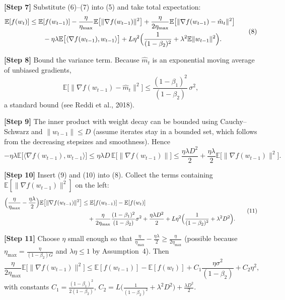 \documentclass[11pt]{article}
\newcommand{\E}{\mathbb{E}}
\begin{document}
\noindent\textbf{[Step 7]} Substitute (6)–(7) into (5) and take total expectation:
\[
\begin{aligned}
\E[f(w_t)] &\le \E[f(w_{t-1})]
-\frac{\eta}{\eta_{\max}}\E\bigl[\|\nabla f(w_{t-1})\|^{2}\bigr]
+\frac{\eta}{2\eta_{\max}}\E\bigl[\|\nabla f(w_{t-1})-\hat m_{t}\|^{2}\bigr] \\
&\qquad -\eta\lambda\E\bigl[\langle\nabla f(w_{t-1}),w_{t-1}\rangle\bigr]
+L\eta^{2}\Bigl(\frac{1}{(1-\beta_2)^{2}}+\lambda^{2}\E\|w_{t-1}\|^{2}\Bigr).
\end{aligned}
\tag{8}
\]

\noindent\textbf{[Step 8]} Bound the variance term. Because $\hat m_t$ is an exponential moving average of unbiased gradients,
\[
\E\bigl[\|\nabla f(w_{t-1})-\hat m_{t}\|^{2}\bigr]\le \frac{(1-\beta_1)^{2}}{(1-\beta_2)}\,\sigma^{2},
\tag{9}
\]
a standard bound (see Reddi et al., 2018).  

\noindent\textbf{[Step 9]} The inner product with weight decay can be bounded using Cauchy–Schwarz and $\|w_{t-1}\|\le D$ (assume iterates stay in a bounded set, which follows from the decreasing stepsizes and smoothness). Hence
\[
-\eta\lambda\E\bigl[\langle\nabla f(w_{t-1}),w_{t-1}\rangle\bigr]
\le \eta\lambda D\,\E\bigl[\|\nabla f(w_{t-1})\|\bigr]
\le \frac{\eta\lambda D^{2}}{2}+\frac{\eta\lambda}{2}\E\bigl[\|\nabla f(w_{t-1})\|^{2}\bigr].
\tag{10}
\]

\noindent\textbf{[Step 10]} Insert (9) and (10) into (8). Collect the terms containing $\E[\|\nabla f(w_{t-1})\|^{2}]$ on the left:
\[
\begin{aligned}
\Bigl(\frac{\eta}{\eta_{\max}}-\frac{\eta\lambda}{2}\Bigr)
\E\bigl[\|\nabla f(w_{t-1})\|^{2}\bigr]
&\le \E[f(w_{t-1})]-\E[f(w_t)] \\
&\quad +\frac{\eta}{2\eta_{\max}}\frac{(1-\beta_1)^{2}}{(1-\beta_2)}\sigma^{2}
+\frac{\eta\lambda D^{2}}{2}
+L\eta^{2}\Bigl(\frac{1}{(1-\beta_2)^{2}}+\lambda^{2}D^{2}\Bigr).
\end{aligned}
\tag{11}
\]

\noindent\textbf{[Step 11]} Choose $\eta$ small enough so that $\frac{\eta}{\eta_{\max}}-\frac{\eta\lambda}{2}\ge\frac{\eta}{2\eta_{\max}}$ (possible because $\eta_{\max}= \frac{\eta}{(1-\beta_2)G}$ and $\lambda\eta\le 1$ by Assumption~4). Then
\[
\frac{\eta}{2\eta_{\max}}\E\bigl[\|\nabla f(w_{t-1})\|^{2}\bigr]
\le \E[f(w_{t-1})]-\E[f(w_t)]
+ C_1\frac{\eta\sigma^{2}}{(1-\beta_2)}+C_2\eta^{2},
\tag{12}
\]
with constants $C_1=\frac{(1-\beta_1)^{2}}{2(1-\beta_2)}$, $C_2=L\bigl(\frac{1}{(1-\beta_2)^{2}}+\lambda^{2}D^{2}\bigr)+\frac{\lambda D^{2}}{2}$.
\end{document}
